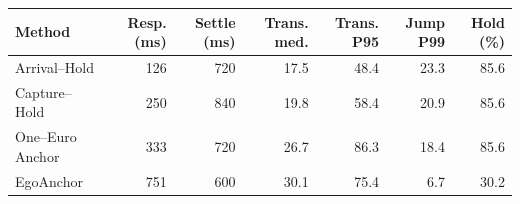 \begin{tabular}{lrrrrrr}
\toprule
Method & Resp. (ms) & Settle (ms) & Trans. med. & Trans. P95 & Jump P99 & Hold (\%) \\
\midrule
Arrival--Hold & 126 & 720 & 17.5 & 48.4 & 23.3 & 85.6 \\
Capture--Hold & 250 & 840 & 19.8 & 58.4 & 20.9 & 85.6 \\
One--Euro Anchor & 333 & 720 & 26.7 & 86.3 & 18.4 & 85.6 \\
EgoAnchor & 751 & 600 & 30.1 & 75.4 & 6.7 & 30.2 \\
\bottomrule
\end{tabular}
